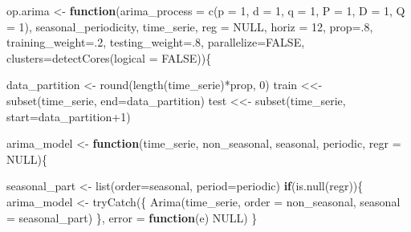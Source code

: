\documentclass[
]{article}
\newenvironment{Shaded}{\begin{snugshade}}{\end{snugshade}}
\newcommand{\AttributeTok}[1]{\textcolor[rgb]{0.77,0.63,0.00}{#1}}
\newcommand{\ConstantTok}[1]{\textcolor[rgb]{0.00,0.00,0.00}{#1}}
\newcommand{\ControlFlowTok}[1]{\textcolor[rgb]{0.13,0.29,0.53}{\textbf{#1}}}
\newcommand{\DecValTok}[1]{\textcolor[rgb]{0.00,0.00,0.81}{#1}}
\newcommand{\FunctionTok}[1]{\textcolor[rgb]{0.00,0.00,0.00}{#1}}
\newcommand{\NormalTok}[1]{#1}
\newcommand{\OtherTok}[1]{\textcolor[rgb]{0.56,0.35,0.01}{#1}}
\newcommand{\SpecialCharTok}[1]{\textcolor[rgb]{0.00,0.00,0.00}{#1}}
\begin{document}
\begin{Shaded}
\begin{Highlighting}[]
\NormalTok{op.arima }\OtherTok{\textless{}{-}} \ControlFlowTok{function}\NormalTok{(}\AttributeTok{arima\_process =} \FunctionTok{c}\NormalTok{(}\AttributeTok{p =} \DecValTok{1}\NormalTok{, }\AttributeTok{d =} \DecValTok{1}\NormalTok{, }\AttributeTok{q =} \DecValTok{1}\NormalTok{, }
                                       \AttributeTok{P =} \DecValTok{1}\NormalTok{, }\AttributeTok{D =} \DecValTok{1}\NormalTok{, }\AttributeTok{Q =} \DecValTok{1}\NormalTok{), }
\NormalTok{                     seasonal\_periodicity,}
\NormalTok{                     time\_serie, }\AttributeTok{reg =} \ConstantTok{NULL}\NormalTok{, }\AttributeTok{horiz =} \DecValTok{12}\NormalTok{,}
                     \AttributeTok{prop=}\NormalTok{.}\DecValTok{8}\NormalTok{, }\AttributeTok{training\_weight=}\NormalTok{.}\DecValTok{2}\NormalTok{, }\AttributeTok{testing\_weight=}\NormalTok{.}\DecValTok{8}\NormalTok{,}
                     \AttributeTok{parallelize=}\ConstantTok{FALSE}\NormalTok{, }\AttributeTok{clusters=}\FunctionTok{detectCores}\NormalTok{(}\AttributeTok{logical =} \ConstantTok{FALSE}\NormalTok{))\{}
    
\NormalTok{    data\_partition }\OtherTok{\textless{}{-}} \FunctionTok{round}\NormalTok{(}\FunctionTok{length}\NormalTok{(time\_serie)}\SpecialCharTok{*}\NormalTok{prop, }\DecValTok{0}\NormalTok{)}
\NormalTok{    train }\OtherTok{\textless{}\textless{}{-}} \FunctionTok{subset}\NormalTok{(time\_serie, }\AttributeTok{end=}\NormalTok{data\_partition)}
\NormalTok{    test }\OtherTok{\textless{}\textless{}{-}} \FunctionTok{subset}\NormalTok{(time\_serie, }\AttributeTok{start=}\NormalTok{data\_partition}\SpecialCharTok{+}\DecValTok{1}\NormalTok{)}
    
\NormalTok{    arima\_model }\OtherTok{\textless{}{-}} \ControlFlowTok{function}\NormalTok{(time\_serie, non\_seasonal, seasonal, }
\NormalTok{                            periodic, }\AttributeTok{regr =} \ConstantTok{NULL}\NormalTok{)\{}
        
\NormalTok{        seasonal\_part }\OtherTok{\textless{}{-}} \FunctionTok{list}\NormalTok{(}\AttributeTok{order=}\NormalTok{seasonal, }\AttributeTok{period=}\NormalTok{periodic)}
        \ControlFlowTok{if}\NormalTok{(}\FunctionTok{is.null}\NormalTok{(regr))\{}
\NormalTok{            arima\_model }\OtherTok{\textless{}{-}} \FunctionTok{tryCatch}\NormalTok{(\{}
                \FunctionTok{Arima}\NormalTok{(time\_serie, }
                      \AttributeTok{order =}\NormalTok{ non\_seasonal, }
                      \AttributeTok{seasonal =}\NormalTok{ seasonal\_part)}
\NormalTok{            \}, }
            \AttributeTok{error =} \ControlFlowTok{function}\NormalTok{(e) }\ConstantTok{NULL}\NormalTok{)  }
\NormalTok{        \}}
        

\end{Highlighting}
\end{Shaded}
\end{document}
